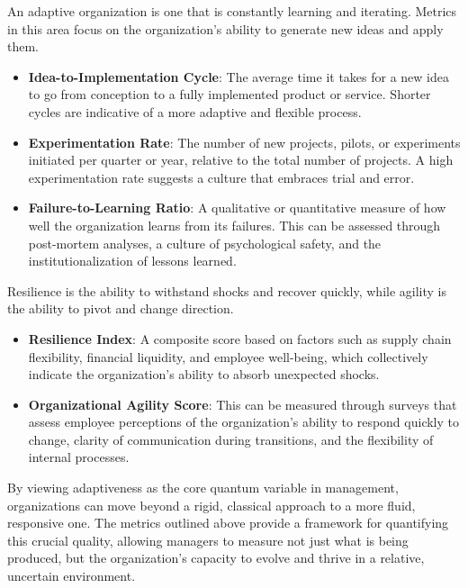 \documentclass{article}
\begin{document}
 
 An adaptive organization is one that is constantly learning and iterating. Metrics in this area focus on the organization's ability to generate new ideas and apply them.
 \begin{itemize}
 	\item \textbf{Idea-to-Implementation Cycle}: The average time it takes for a new idea to go from conception to a fully implemented product or service. Shorter cycles are indicative of a more adaptive and flexible process.
 	\item \textbf{Experimentation Rate}: The number of new projects, pilots, or experiments initiated per quarter or year, relative to the total number of projects. A high experimentation rate suggests a culture that embraces trial and error.
 	\item \textbf{Failure-to-Learning Ratio}: A qualitative or quantitative measure of how well the organization learns from its failures. This can be assessed through post-mortem analyses, a culture of psychological safety, and the institutionalization of lessons learned.
 \end{itemize}
 
 
 Resilience is the ability to withstand shocks and recover quickly, while agility is the ability to pivot and change direction.
 \begin{itemize}
 	\item \textbf{Resilience Index}: A composite score based on factors such as supply chain flexibility, financial liquidity, and employee well-being, which collectively indicate the organization's ability to absorb unexpected shocks.
 	\item \textbf{Organizational Agility Score}: This can be measured through surveys that assess employee perceptions of the organization's ability to respond quickly to change, clarity of communication during transitions, and the flexibility of internal processes.
 \end{itemize}
 
  

 
 By viewing adaptiveness as the core quantum variable in management, organizations can move beyond a rigid, classical approach to a more fluid, responsive one. The metrics outlined above provide a framework for quantifying this crucial quality, allowing managers to measure not just what is being produced, but the organization's capacity to evolve and thrive in a relative, uncertain environment.
 
\end{document}
